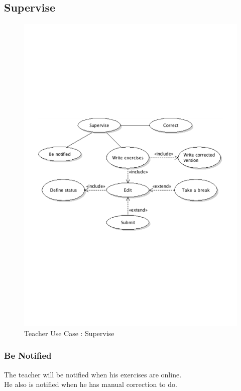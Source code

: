 	\subsection{Supervise}
		\begin{figure}[ht]
			\begin{center}
				\includegraphics[width=\textwidth,  trim=2cm 10cm 2cm 9cm]{UML_figure/UC/teacher/UC_Teacher_Supervise.pdf}
				\caption{Teacher Use Case : Supervise}
			\end{center}
		\end{figure}
		\subsubsection{Be Notified}
			The teacher will be notified when his exercises are online.\\
			He also is notified when he has manual correction to do.
